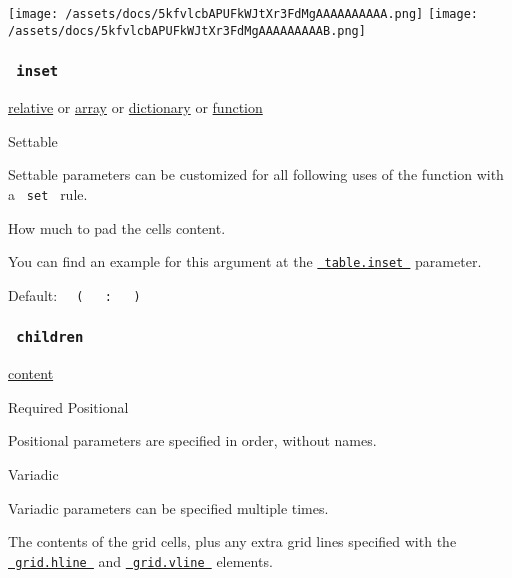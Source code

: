 \texttt{[image: /assets/docs/5kfvlcbAPUFkWJtXr3FdMgAAAAAAAAAA.png]}
\texttt{[image: /assets/docs/5kfvlcbAPUFkWJtXr3FdMgAAAAAAAAAB.png]}

\subsubsection{\texorpdfstring{\texttt{\ inset\ }}{ inset }}\label{parameters-inset}

\href{/docs/reference/layout/relative/}{relative} {or}
\href{/docs/reference/foundations/array/}{array} {or}
\href{/docs/reference/foundations/dictionary/}{dictionary} {or}
\href{/docs/reference/foundations/function/}{function}

{{ Settable }}

\label{parameters-inset-settable-tooltip}
Settable parameters can be customized for all following uses of the
function with a \texttt{\ set\ } rule.

How much to pad the cells\textquotesingle{} content.

You can find an example for this argument at the
\href{/docs/reference/model/table/\#parameters-inset}{\texttt{\ table.inset\ }}
parameter.

Default:
\texttt{\ }{\texttt{\ (\ }}\texttt{\ }{\texttt{\ :\ }}\texttt{\ }{\texttt{\ )\ }}\texttt{\ }

\subsubsection{\texorpdfstring{\texttt{\ children\ }}{ children }}\label{parameters-children}

\href{/docs/reference/foundations/content/}{content}

{Required} {{ Positional }}

\label{parameters-children-positional-tooltip}
Positional parameters are specified in order, without names.

{{ Variadic }}

\label{parameters-children-variadic-tooltip}
Variadic parameters can be specified multiple times.

The contents of the grid cells, plus any extra grid lines specified with
the
\href{/docs/reference/layout/grid/\#definitions-hline}{\texttt{\ grid.hline\ }}
and
\href{/docs/reference/layout/grid/\#definitions-vline}{\texttt{\ grid.vline\ }}
elements.

